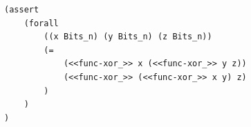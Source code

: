 \begin{longlisting}
\begin{verbatim}
(assert 
    (forall 
        ((x Bits_n) (y Bits_n) (z Bits_n)) 
        (= 
            (<<func-xor_>> x (<<func-xor_>> y z)) 
            (<<func-xor_>> (<<func-xor_>> x y) z)
        )
    )
)
\end{verbatim}
\caption{An assertion for associativity of the  function}
\label{lst:domino-smtlib-assert-xor}
\end{longlisting}